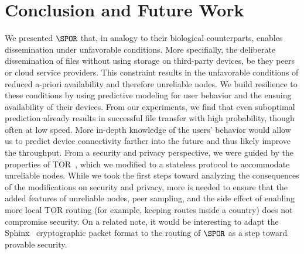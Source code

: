 \section{Conclusion and Future Work}

We presented \(\SPOR\) that, in analogy to their biological
counterparts, enables dissemination under unfavorable conditions. More
specifially, the deliberate dissemination of files without using
storage on third-party devices, be they peers or cloud service
providers. This constraint results in the unfavorable conditions of
reduced a-priori availability and therefore unreliable nodes. We build
resilience to these conditions by using predictive modeling for user
behavior and the ensuing availability of their devices. From our
experiments, we find that even suboptimal prediction already results in
successful file transfer with high probability, though often at low
speed. More in-depth knowledge of the users' behavior would allow us
to predict device connectivity farther into the future and thus likely
improve the throughput. From a security and privacy perspective, we
were guided by the properties of TOR~\cite{Tor}, which we modified to
a stateless protocol to accommodate unreliable nodes. While we took
the first steps toward analyzing the consequences of the modifications
on security and privacy, more is needed to ensure that the added
features of unreliable nodes, peer sampling, and the side effect of
enabling more local TOR routing (for example, keeping routes inside a
country) does not compromise security. On a related note, it would be
interesting to adapt the Sphinx~\cite{Sphinx} cryptographic packet
format to the routing of \(\SPOR\) as a step toward provable security.




